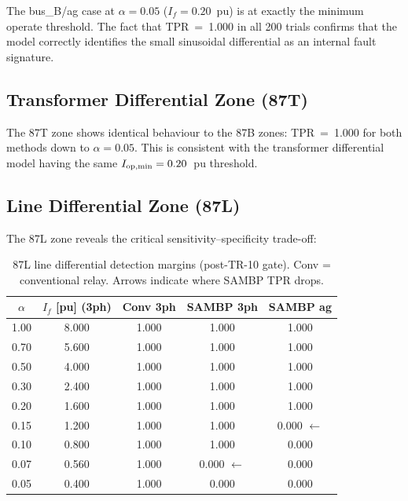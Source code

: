 \documentclass[12pt,a4paper]{article}
\newcommand{\Iopmin}{I_{\rm op,min}}
\begin{document}
The bus\_B/ag case at $\alpha = 0.05$ ($I_f = 0.20$~pu) is at exactly
the minimum operate threshold.  The fact that TPR~=~1.000 in all 200
trials confirms that the model correctly identifies the small sinusoidal
differential as an internal fault signature.

\subsection{Transformer Differential Zone (87T)}

The 87T zone shows identical behaviour to the 87B zones: TPR~=~1.000
for both methods down to $\alpha = 0.05$.  This is consistent with
the transformer differential model having the same $\Iopmin = 0.20$~pu
threshold.

\subsection{Line Differential Zone (87L)}

The 87L zone reveals the critical sensitivity--specificity trade-off:

\begin{table}[ht]
\centering
\caption{87L line differential detection margins (post-TR-10 gate).
  Conv = conventional relay.  Arrows indicate where SAMBP TPR drops.}
\label{tab:87L}
\begin{tabular}{ccccc}
\toprule
$\alpha$ & $I_f$ [pu] (3ph) & Conv 3ph & SAMBP 3ph & SAMBP ag \\
\midrule
1.00 & 8.000 & 1.000 & 1.000 & 1.000 \\
0.70 & 5.600 & 1.000 & 1.000 & 1.000 \\
0.50 & 4.000 & 1.000 & 1.000 & 1.000 \\
0.30 & 2.400 & 1.000 & 1.000 & 1.000 \\
0.20 & 1.600 & 1.000 & 1.000 & 1.000 \\
0.15 & 1.200 & 1.000 & 1.000 & \textcolor{warnred}{0.000} $\leftarrow$ \\
0.10 & 0.800 & 1.000 & 1.000 & \textcolor{warnred}{0.000} \\
0.07 & 0.560 & 1.000 & \textcolor{warnred}{0.000} $\leftarrow$ & \textcolor{warnred}{0.000} \\
0.05 & 0.400 & 1.000 & \textcolor{warnred}{0.000} & \textcolor{warnred}{0.000} \\
\bottomrule
\end{tabular}
\end{table}
\end{document}
